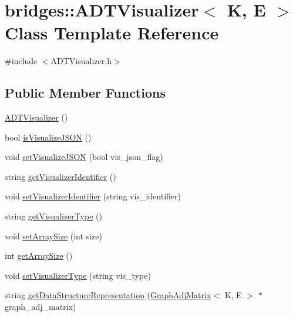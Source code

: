 \hypertarget{classbridges_1_1_a_d_t_visualizer}{}\section{bridges\+:\+:A\+D\+T\+Visualizer$<$ K, E $>$ Class Template Reference}
\label{classbridges_1_1_a_d_t_visualizer}


{\ttfamily \#include $<$A\+D\+T\+Visualizer.\+h$>$}

\subsection*{Public Member Functions}
\begin{DoxyCompactItemize}
\item 
\hyperlink{classbridges_1_1_a_d_t_visualizer_a7aeb662bedb4275ae3b4d9e6042771ea}{A\+D\+T\+Visualizer} ()
\item 
bool \hyperlink{classbridges_1_1_a_d_t_visualizer_a5705e913cd68b365dbcce735b244fc19}{is\+Visualize\+J\+S\+O\+N} ()
\item 
void \hyperlink{classbridges_1_1_a_d_t_visualizer_a3df170e02b0e64324b02987823a7d39d}{set\+Visualize\+J\+S\+O\+N} (bool vis\+\_\+json\+\_\+flag)
\item 
string \hyperlink{classbridges_1_1_a_d_t_visualizer_a8341eff2cb8069224671f5c7e99ebc27}{get\+Visualizer\+Identifier} ()
\item 
void \hyperlink{classbridges_1_1_a_d_t_visualizer_aa8744e8d1d2b308134a143489a1d99bf}{set\+Visualizer\+Identifier} (string vis\+\_\+identifier)
\item 
string \hyperlink{classbridges_1_1_a_d_t_visualizer_af64c11473910177160374c7ab10088ee}{get\+Visualizer\+Type} ()
\item 
void \hyperlink{classbridges_1_1_a_d_t_visualizer_a729ef76a688915b6e3e076c2311d9bef}{set\+Array\+Size} (int size)
\item 
int \hyperlink{classbridges_1_1_a_d_t_visualizer_a2a88784e70202d2f782e9bfe5570ed54}{get\+Array\+Size} ()
\item 
void \hyperlink{classbridges_1_1_a_d_t_visualizer_a6ab87acd793e9db9d2769f3fc36f38ee}{set\+Visualizer\+Type} (string vis\+\_\+type)
\item 
string \hyperlink{classbridges_1_1_a_d_t_visualizer_a804d83b3b21c18df6b12f7b9ca493a36}{get\+Data\+Structure\+Representation} (\hyperlink{classbridges_1_1_graph_adj_matrix}{Graph\+Adj\+Matrix}$<$ K, E $>$ $\ast$graph\+\_\+adj\+\_\+matrix)

\end{DoxyCompactItemize}
